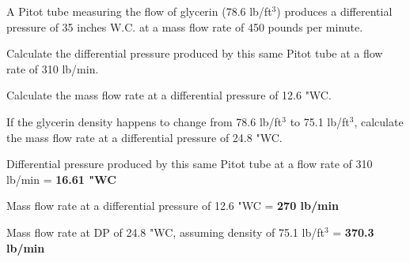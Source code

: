 
A Pitot tube measuring the flow of glycerin (78.6 lb/ft$^{3}$) produces a differential pressure of 35 inches W.C. at a mass flow rate of 450 pounds per minute.

\vskip 10pt

Calculate the differential pressure produced by this same Pitot tube at a flow rate of 310 lb/min.

\vskip 10pt

Calculate the mass flow rate at a differential pressure of 12.6 "WC.

\vskip 10pt

If the glycerin density happens to change from 78.6 lb/ft$^{3}$ to 75.1 lb/ft$^{3}$, calculate the mass flow rate at a differential pressure of 24.8 "WC.







Differential pressure produced by this same Pitot tube at a flow rate of 310 lb/min = {\bf 16.61 "WC}

\vskip 10pt

Mass flow rate at a differential pressure of 12.6 "WC = {\bf 270 lb/min}

\vskip 10pt

Mass flow rate at DP of 24.8 "WC, assuming density of 75.1 lb/ft$^{3}$ = {\bf 370.3 lb/min}











